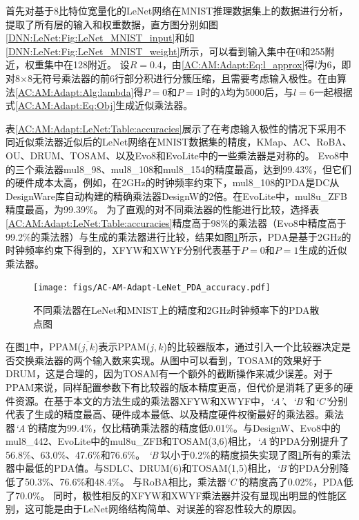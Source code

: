 首先对基于8比特位宽量化的LeNet网络在MNIST推理数据集\cite{DNN:LeNet_MNIST}上的数据进行分析，提取了所有层的输入和权重数据，直方图分别如图\ref{DNN:LeNet:Fig:LeNet_MNIST_input}和如\ref{DNN:LeNet:Fig:LeNet_MNIST_weight}所示，可以看到输入集中在0和255附近，权重集中在128附近。
设$R=0.4$，由\eqref{AC:AM:Adapt:Eq:l_approx}得$l$为6，即对8$\times$8无符号乘法器的前6行部分积进行分簇压缩，且需要考虑输入极性。在由算法\ref{AC:AM:Adapt:Alg:lambda}得$P=0$和$P=1$时的$\lambda$均为5000后，与$l=6$一起根据式\eqref{AC:AM:Adapt:Eq:Obj}生成近似乘法器。

表\ref{AC:AM:Adapt:LeNet:Table:accuracies}展示了在考虑输入极性的情况下采用不同近似乘法器近似后的LeNet网络在MNIST数据集的精度，KMap、AC、RoBA、OU、DRUM、TOSAM、以及Evo8和EvoLite中的一些乘法器是对称的。
Evo8中的三个乘法器mul8\_98、mul8\_108和mul8\_154的精度最高，达到99.43\%，但它们的硬件成本太高，例如，在2GHz的时钟频率约束下，mul8\_108的PDA是DC从DesignWare库自动构建的精确乘法器DesignW的2倍。在EvoLite中，mul8u\_ZFB精度最高，为99.39\%。
为了直观的对不同乘法器的性能进行比较，选择表\ref{AC:AM:Adapt:LeNet:Table:accuracies}精度高于98\%的乘法器（Evo8中精度高于99.2\%的乘法器）与生成的乘法器进行比较，结果如图\ref{AC:AM:Adapt:Fig:LeNet_PDA_accuracy}所示，PDA是基于2GHz的时钟频率约束下得到的，XFYW和XWYF分别代表基于$P=0$和$P=1$生成的近似乘法器。

\begin{figure}[!h]
    \centering
    \texttt{[image: figs/AC-AM-Adapt-LeNet\_PDA\_accuracy.pdf]}
    \caption{不同乘法器在LeNet和MNIST上的精度和2GHz时钟频率下的PDA散点图}
    \label{AC:AM:Adapt:Fig:LeNet_PDA_accuracy}
\end{figure}

在图\ref{AC:AM:Adapt:Fig:LeNet_PDA_accuracy}中，PPAM($\overline{j,k}$)表示PPAM($j,k$)的比较器版本，通过引入一个比较器决定是否交换乘法器的两个输入数来实现。从图中可以看到，TOSAM的效果好于DRUM，这是合理的，因为TOSAM有一个额外的截断操作来减少误差。对于PPAM来说，同样配置参数下有比较器的版本精度更高，但代价是消耗了更多的硬件资源。在基于本文的方法生成的乘法器XFYW和XWYF中，\emph{`A'}、\emph{`B'}和\emph{`C'}分别代表了生成的精度最高、硬件成本最低、以及精度硬件权衡最好的乘法器。乘法器\emph{`A'}的精度为99.4\%，仅比精确乘法器的精度低0.01\%。与DesignW、Evo8中的mul8\_442、EvoLite中的mul8u\_ZFB和TOSAM(3,6)相比，\emph{`A'}的PDA分别提升了56.8\%、63.0\%、47.6\%和76.6\%。
\emph{`B'}以小于0.2\%的精度损失实现了图\ref{AC:AM:Adapt:Fig:LeNet_PDA_accuracy}所有的乘法器中最低的PDA值。与SDLC、DRUM(6)和TOSAM(1,5)相比，\emph{`B'}的PDA分别降低了50.3\%、76.6\%和48.4\%。
与RoBA相比，乘法器\emph{`C'}的精度高了0.02\%，PDA低了70.0\%。
同时，极性相反的XFYW和XWYF乘法器并没有显现出明显的性能区别，这可能是由于LeNet网络结构简单、对误差的容忍性较大的原因。


